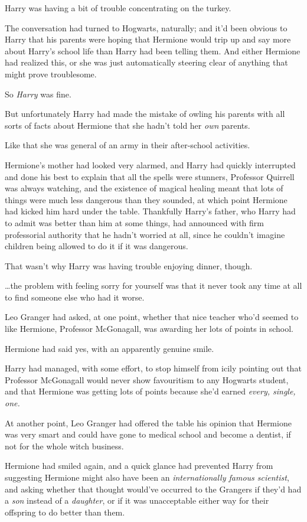 Harry was having a bit of trouble concentrating on the turkey.

The conversation had turned to Hogwarts, naturally; and it'd been obvious to
Harry that his parents were hoping that Hermione would trip up and say more
about Harry's school life than Harry had been telling them. And either Hermione
had realized this, or she was just automatically steering clear of anything
that might prove troublesome.

So \emph{Harry} was fine.

But unfortunately Harry had made the mistake of owling his parents with all
sorts of facts about Hermione that she hadn't told her \emph{own} parents.

Like that she was general of an army in their after-school activities.

Hermione's mother had looked very alarmed, and Harry had quickly interrupted
and done his best to explain that all the spells were stunners, Professor
Quirrell was always watching, and the existence of magical healing meant that
lots of things were much less dangerous than they sounded, at which point
Hermione had kicked him hard under the table. Thankfully Harry's father, who
Harry had to admit was better than him at some things, had announced with firm
professorial authority that he hadn't worried at all, since he couldn't imagine
children being allowed to do it if it was dangerous.

That wasn't why Harry was having trouble enjoying dinner, though.

…the problem with feeling sorry for yourself was that it never took any
time at all to find someone else who had it worse.

Leo Granger had asked, at one point, whether that nice teacher who'd seemed
to like Hermione, Professor McGonagall, was awarding her lots of points in
school.

Hermione had said yes, with an apparently genuine smile.

Harry had managed, with some effort, to stop himself from icily pointing out
that Professor McGonagall would never show favouritism to any Hogwarts student,
and that Hermione was getting lots of points because she'd earned \emph{every,
single, one.}

At another point, Leo Granger had offered the table his opinion that Hermione
was very smart and could have gone to medical school and become a dentist, if
not for the whole witch business.

Hermione had smiled again, and a quick glance had prevented Harry from
suggesting Hermione might also have been an \emph{internationally famous
scientist}, and asking whether that thought would've occurred to the Grangers
if they'd had a \emph{son} instead of a \emph{daughter}, or if it was
unacceptable either way for their offspring to do better than them.

